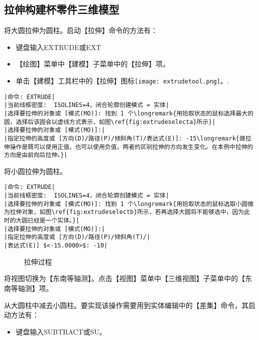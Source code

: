 \subsection{拉伸构建杯零件三维模型}
\begin{procedure}
\item 将大圆拉伸为圆柱。启动【拉伸】命令的方法有：
\begin{itemize}
\item 键盘输入EXTRUDE或EXT
\item 【绘图】菜单中【建模】子菜单中的【拉伸】项。
\item 单击【建模】工具栏中的【拉伸】图标\texttt{[image: extrudetool.png]}。.
\end{itemize}
\begin{lstlisting}
|命令: EXTRUDE|
|当前线框密度:  ISOLINES=4，闭合轮廓创建模式 = 实体|
|选择要拉伸的对象或 [模式(MO)]: 找到 1 个\longremark{用拾取状态的鼠标选择最大的圆，选择后该圆会以虚线方式表示，如图\ref{fig:extrudeselecta}所示}|
|选择要拉伸的对象或 [模式(MO)]:|
|指定拉伸的高度或 [方向(D)/路径(P)/倾斜角(T)/表达式(E)]: -15\longremark{做拉伸操作是既可以使用正值，也可以使用负值，两者的区别拉伸的方向发生变化。在本例中拉伸的方向是由前向后拉伸。}|
\end{lstlisting}
\item 将小圆拉伸为圆柱。
\begin{lstlisting}
|命令: EXTRUDE|
|当前线框密度:  ISOLINES=4，闭合轮廓创建模式 = 实体|
|选择要拉伸的对象或 [模式(MO)]: 找到 1 个\longremark{用拾取状态的鼠标选取小圆做为拉伸对象，如图\ref{fig:extrudeselectb}所示，若再选择大圆将不能够选中，因为此时的大圆已经是一个实体。}|
|选择要拉伸的对象或 [模式(MO)]:|
|指定拉伸的高度或 [方向(D)/路径(P)/倾斜角(T)/|
|表达式(E)] $<-15.0000>$: -10|
\end{lstlisting}
\begin{figure}[htbp]
\centering
{}\hspace{20pt}
\caption{拉伸过程}
\end{figure}
\showremarks
\item 将视图切换为【东南等轴测】。点击【视图】菜单中【三维视图】子菜单中的【东南等轴测】项。
\item 从大圆柱中减去小圆柱。要实现该操作需要用到实体编辑中的【差集】命令，其启动方法有：
\begin{itemize}
\item 键盘输入SUBTRACT或SU。

\end{itemize}
\end{procedure}
